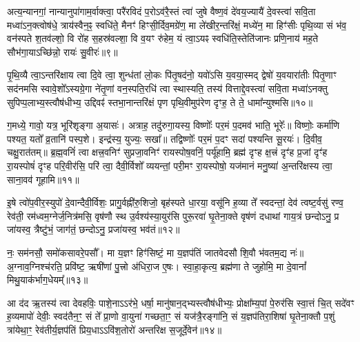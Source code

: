 {\anuvakamend[{गा॒तु॒विद॒भ्येक॑त्रिꣳशच्च॥४॥}]}

अत्य॒न्यानगां॒ नान्यानुपा॑गाम॒र्वाक्त्वा॒ परै॑रविदं प॒रो\-ऽव॑रै॒स्तं त्वा॑ जुषे वैष्ण॒वं दे॑वय॒ज्यायै॑ दे॒वस्त्वा॑ सवि॒ता मध्वा॑\-ऽन॒क्त्वोष॑धे॒ त्राय॑स्वैन॒ꣴ॒ स्वधि॑ते॒ मैनꣳ॑ हिꣳसी॒र्दिव॒मग्रे॑ण॒ मा ले॑खीर॒न्तरि॑क्षं॒ मध्ये॑न॒ मा हिꣳ॑सीः पृथि॒व्या सं भ॑व॒ वन॑स्पते श॒तव॑ल्\mbox{}शो॒ वि रो॑ह स॒हस्र॑वल्\mbox{}शा॒ वि व॒यꣳ रु॑हेम॒ यं त्वा॒\-ऽयꣴ स्वधि॑ति॒स्तेति॑जानः प्रणि॒नाय॑ मह॒ते सौभ॑गा॒या\-ऽच्छि॑न्नो॒ रायः॑ सु॒वीरः॑॥९॥

{\anuvakamend[{यं दश॑ च॥५॥}]}

पृ॒थि॒व्यै त्वा॒\-ऽन्तरि॑क्षाय त्वा दि॒वे त्वा॒ शुन्ध॑तां लो॒कः पि॑तृ॒षद॑नो॒ यवो॑\-ऽसि य॒वया॒स्मद् द्वेषो॑ य॒वयारा॑तीः पितृ॒णाꣳ सद॑नमसि स्वावे॒शो᳚\-ऽस्यग्रे॒गा ने॑तृ॒णां वन॒स्पति॒रधि॑ त्वा स्थास्यति॒ तस्य॑ वित्ताद्दे॒वस्त्वा॑ सवि॒ता मध्वा॑\-ऽनक्तु सुपिप्प॒लाभ्य॒स्त्वौष॑धीभ्य॒ उद्दिवꣴ॑ स्तभा॒नान्तरि॑क्षं पृण पृथि॒वीमुप॑रेण दृꣳह॒ ते ते॒ धामा᳚न्युश्मसि॥१०॥

ग॒मध्ये॒ गावो॒ यत्र॒ भूरि॑शृङ्गा अ॒यासः॑। अत्राह॒ तदु॑रुगा॒यस्य॒ विष्णोः᳚ पर॒मं प॒दमव॑ भाति॒ भूरेः᳚॥ विष्णोः॒ कर्मा॑णि पश्यत॒ यतो᳚ व्र॒तानि॑ पस्प॒शे। इन्द्र॑स्य॒ युज्यः॒ सखा᳚॥ तद्विष्णोः᳚ पर॒मं प॒दꣳ सदा॑ पश्यन्ति सू॒रयः॑। दि॒वीव॒ चक्षु॒रात॑तम्॥ ब्र॒ह्म॒वनिं॑ त्वा क्षत्त्र॒वनिꣳ॑ सुप्रजा॒वनिꣳ॑ रायस्पोष॒वनिं॒ पर्यू॑हामि॒ ब्रह्म॑ दृꣳह क्ष॒त्त्रं दृꣳ॑ह प्र॒जां दृꣳ॑ह रा॒यस्पोषं॑ दृꣳह परि॒वीर॑सि॒ परि॑ त्वा॒ दैवी॒र्विशो᳚ व्ययन्तां॒ परी॒मꣳ रा॒यस्पोषो॒ यज॑मानं मनु॒ष्या॑ अ॒न्तरि॑क्षस्य त्वा॒ साना॒वव॑ गूहामि॥११॥

{\anuvakamend[{उ॒श्म॒सी॒ पोष॒मेका॒न्नविꣳ॑श॒तिश्च॑॥६॥}]}

इ॒षे त्वो॑प॒वीर॒स्युपो॑ दे॒वान्दैवी॒र्विशः॒ प्रागु॒र्वह्नी॑रु॒शिजो॒ बृह॑स्पते धा॒रया॒ वसू॑नि ह॒व्या ते᳚ स्वदन्तां॒ देव॑ त्वष्ट॒र्वसु॑ रण्व॒ रेव॑ती॒ रम॑ध्वम॒ग्नेर्ज॒नित्र॑मसि॒ वृष॑णौ स्थ उ॒र्वश्य॑स्या॒युर॑सि पुरू॒रवा॑ घृ॒तेना॒क्ते वृष॑णं दधाथां गाय॒त्रं छन्दो\-ऽनु॒ प्र जा॑यस्व॒ त्रैष्टु॑भं॒ जाग॑तं॒ छन्दो\-ऽनु॒ प्रजा॑यस्व॒ भव॑तं॥१२॥

नः॒ सम॑नसौ॒ समो॑कसावरे॒पसौ᳚। मा य॒ज्ञꣳ हिꣳ॑सिष्टं॒ मा य॒ज्ञप॑तिं जातवेदसौ शि॒वौ भ॑वतम॒द्य नः॑॥ अ॒ग्नाव॒ग्निश्च॑रति॒ प्रवि॑ष्ट॒ ऋषी॑णां पु॒त्त्रो अ॑धिरा॒ज ए॒षः। स्वा॒हा॒कृत्य॒ ब्रह्म॑णा ते जुहोमि॒ मा दे॒वानां᳚ मिथु॒याक॑र्भाग॒धेयम्᳚॥१३॥

{\anuvakamend[{भव॑त॒मेक॑त्रिꣳशच्च॥७॥}]}

आ द॑द ऋ॒तस्य॑ त्वा देवहविः॒ पाशे॒ना\-ऽ\-ऽर॑भे॒ धर्\mbox{}षा॒ मानु॑षान॒द्भ्यस्त्वौष॑धीभ्यः॒ प्रोक्षा᳚म्य॒पां पे॒रुर॑सि स्वा॒त्तं चि॒त् सदे॑वꣳ ह॒व्यमापो॑ देवीः॒ स्वद॑तैन॒ꣳ॒ सं ते᳚ प्रा॒णो वा॒युना॑ गच्छता॒ꣳ॒ सं यज॑त्रै॒रङ्गा॑नि॒ सं य॒ज्ञप॑तिरा॒शिषा॑ घृ॒तेना॒क्तौ प॒शुं त्रा॑येथा॒ꣳ॒ रेव॑तीर्य॒ज्ञप॑तिं प्रिय॒धा\-ऽ\-ऽवि॑श॒तोरो॑ अन्तरिक्ष स॒जूर्दे॒वेन॑॥१४॥

